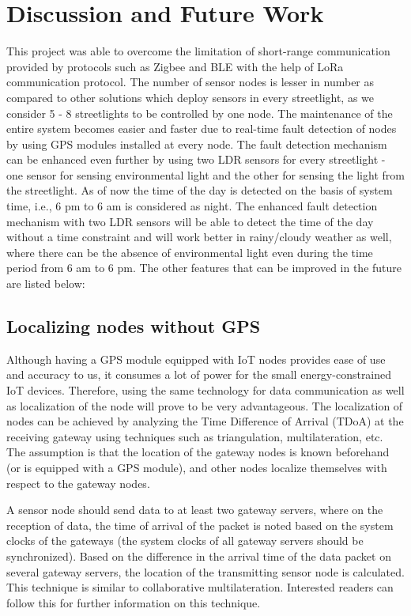 \documentclass[11pt, oneside]{article}   	%
\begin{document}
\section{Discussion and Future Work}
This project was able to overcome the limitation of short-range communication provided by protocols such as Zigbee and BLE with the help of LoRa communication protocol. The number of sensor nodes is lesser in number as compared to other solutions which deploy sensors in every streetlight, as we consider 5 - 8 streetlights to be controlled by one node. The maintenance of the entire system becomes easier and faster due to real-time fault detection of nodes by using GPS modules installed at every node. The fault detection mechanism can be enhanced even further by using two LDR sensors for every streetlight - one sensor for sensing environmental light and the other for sensing the light from the streetlight. As of now the time of the day is detected on the basis of system time, i.e., 6 pm to 6 am is considered as night. The enhanced fault detection mechanism with two LDR sensors will be able to detect the time of the day without a time constraint and will work better in rainy/cloudy weather as well, where there can be the absence of environmental light even during the time period from 6 am to 6 pm. The other features that can be improved in the future are listed below:

\subsection{Localizing nodes without GPS}
Although having a GPS module equipped with IoT nodes provides ease of use and accuracy to us, it consumes a lot of power for the small energy-constrained IoT devices. Therefore, using the same technology for data communication as well as localization of the node will prove to be very advantageous. The localization of nodes can be achieved by analyzing the Time Difference of Arrival (TDoA) at the receiving gateway using techniques such as triangulation, multilateration, etc. The assumption is that the location of the gateway nodes is known beforehand (or is equipped with a GPS module), and other nodes localize themselves with respect to the gateway nodes.

A sensor node should send data to at least two gateway servers, where on the reception of data, the time of arrival of the packet is noted based on the system clocks of the gateways (the system clocks of all gateway servers should be synchronized). Based on the difference in the arrival time of the data packet on several gateway servers, the location of the transmitting sensor node is calculated. This technique is similar to collaborative multilateration. Interested readers can follow this for further information on this \cite{15} technique.
\end{document}
